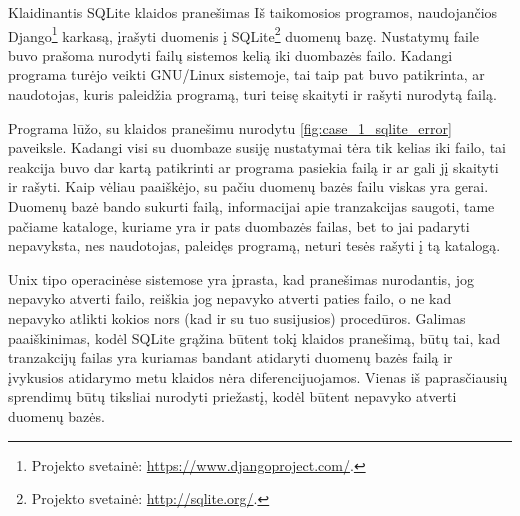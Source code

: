 \begin{xcase}{Klaidinantis SQLite klaidos pranešimas}
  \xcgoal
  {
    Iš taikomosios programos, naudojančios 
    Django\footnote{Projekto svetainė: \url{https://www.djangoproject.com/}.} 
    karkasą, įrašyti duomenis į
    SQLite\footnote{Projekto svetainė: \url{http://sqlite.org/}.}
    duomenų bazę.
  }
  \xctools
  {
    Nustatymų faile buvo prašoma nurodyti failų sistemos kelią iki duombazės 
    failo. Kadangi programa turėjo veikti GNU/Linux sistemoje, tai taip
    pat buvo patikrinta, ar naudotojas, kuris paleidžia programą, turi
    teisę skaityti ir rašyti nurodytą failą.
  }
  \xcresult
  {
    Programa lūžo, su klaidos pranešimu nurodytu
    \ref{fig:case_1_sqlite_error} paveiksle. Kadangi visi su duombaze susiję
    nustatymai tėra tik kelias iki failo, tai reakcija buvo dar kartą
    patikrinti ar programa pasiekia failą ir ar gali jį skaityti ir rašyti.
    Kaip vėliau paaiškėjo, su pačiu duomenų bazės failu viskas yra gerai.
    Duomenų bazė bando sukurti failą, informacijai apie tranzakcijas
    saugoti, tame pačiame kataloge, kuriame yra ir pats duombazės failas,
    bet to jai padaryti nepavyksta, nes naudotojas, paleidęs programą,
    neturi tesės rašyti į tą katalogą.
    
  }
  \xcprinciples
  {
    {
      Unix tipo operacinėse
      sistemose yra įprasta, kad pranešimas nurodantis, jog nepavyko
      atverti failo, reiškia jog nepavyko atverti paties failo, o ne
      kad nepavyko atlikti kokios nors (kad ir su tuo susijusios)
      procedūros.
    }
  }
  \xcthoughts
  {
    Galimas paaiškinimas, kodėl SQLite grąžina būtent tokį klaidos
    pranešimą, būtų tai, kad tranzakcijų failas yra kuriamas bandant
    atidaryti duomenų bazės failą ir įvykusios atidarymo metu klaidos
    nėra diferencijuojamos. Vienas iš paprasčiausių sprendimų būtų
    tiksliai nurodyti priežastį, kodėl būtent nepavyko atverti
    duomenų bazės.
  }
\end{xcase}
